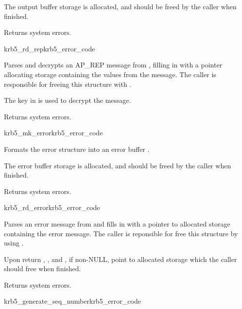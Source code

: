The output buffer storage is allocated, and should be freed by the
caller when finished.

Returns system errors.

\begin{funcdecl}{krb5_rd_rep}{krb5_error_code}{\funcin}
\funcout
{}
\end{funcdecl}

Parses and decrypts an AP_REP message from , filling in
 with a pointer allocating storage containing the
values from the message.  The caller is responsible for freeing this
structure with .

The key in  is used to decrypt the message.

Returns system errors.

\begin{funcdecl}{krb5_mk_error}{krb5_error_code}{\funcin}
\funcout
{}
\end{funcdecl}

Formats the error structure  into an error buffer
.

The error buffer storage is allocated, and should be freed by the
caller when finished.

Returns system errors.

\begin{funcdecl}{krb5_rd_error}{krb5_error_code}{\funcin}
\funcout
{}
\end{funcdecl}

Parses an error message from  and fills in 
 with a pointer to allocated storage containing
the error message.  The caller is reponsible for free this structure by
using .

Upon return ,
, and
, if non-NULL, point to allocated
storage which the caller should free when finished.

Returns system errors.

\begin{funcdecl}{krb5_generate_seq_number}{krb5_error_code}{\funcin}
\funcout
{}
\end{funcdecl}

